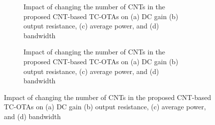 
\begin{figure}[htbp]
  \centering
  \begin{subfigure}[b]{0.48\linewidth}
    \centering
    \caption{Impact of changing the number of CNTs in the proposed CNT-based TC-OTAs on (a) DC gain (b) output resistance, (c) average power, and (d) bandwidth}

  \end{subfigure}
  \hfill
  \begin{subfigure}[b]{0.48\linewidth}
    \centering
    \caption{Impact of changing the number of CNTs in the proposed CNT-based TC-OTAs on (a) DC gain (b) output resistance, (c) average power, and (d) bandwidth}

  \end{subfigure}
  \caption{Impact of changing the number of CNTs in the proposed CNT-based TC-OTAs on (a) DC gain (b) output resistance, (c) average power, and (d) bandwidth}

  \label{fig:group_hyrsd}
\end{figure}
